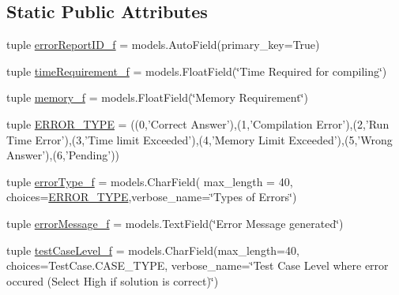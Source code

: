 \subsection*{Static Public Attributes}
\begin{DoxyCompactItemize}
\item 
tuple \hyperlink{class_ecodena_1_1_attempt_1_1models_1_1_error_report_a2af69996b9b6d05f1bdfeff5d05f1fc6}{errorReportID\_\-f} = models.AutoField(primary\_\-key=True)
\item 
tuple \hyperlink{class_ecodena_1_1_attempt_1_1models_1_1_error_report_aafea830ed4b75d8af62b447a58a23fdb}{timeRequirement\_\-f} = models.FloatField(\char`\"{}Time Required for compiling\char`\"{})
\item 
tuple \hyperlink{class_ecodena_1_1_attempt_1_1models_1_1_error_report_a6251188760c30f622c68f126ba37c765}{memory\_\-f} = models.FloatField(\char`\"{}Memory Requirement\char`\"{})
\item 
tuple \hyperlink{class_ecodena_1_1_attempt_1_1models_1_1_error_report_a83fffbd11c0969a40133740c84f41bc1}{ERROR\_\-TYPE} = ((0,'Correct Answer'),(1,'Compilation Error'),(2,'Run Time Error'),(3,'Time limit Exceeded'),(4,'Memory Limit Exceeded'),(5,'Wrong Answer'),(6,'Pending'))
\item 
tuple \hyperlink{class_ecodena_1_1_attempt_1_1models_1_1_error_report_a2206247ced5f221ac3622b203c27d98a}{errorType\_\-f} = models.CharField( max\_\-length = 40, choices=\hyperlink{class_ecodena_1_1_attempt_1_1models_1_1_error_report_a83fffbd11c0969a40133740c84f41bc1}{ERROR\_\-TYPE},verbose\_\-name=\char`\"{}Types of Errors\char`\"{})
\item 
tuple \hyperlink{class_ecodena_1_1_attempt_1_1models_1_1_error_report_ac3c6ddeb8bb514c31ef17a8b2c61fbbe}{errorMessage\_\-f} = models.TextField(\char`\"{}Error Message generated\char`\"{})
\item 
tuple \hyperlink{class_ecodena_1_1_attempt_1_1models_1_1_error_report_abb78bf4e72de46a0c4d144d5e95ed80d}{testCaseLevel\_\-f} = models.CharField(max\_\-length=40, choices=TestCase.CASE\_\-TYPE, verbose\_\-name=\char`\"{}Test Case Level where error occured (Select High if solution is correct)\char`\"{})
\end{DoxyCompactItemize}

